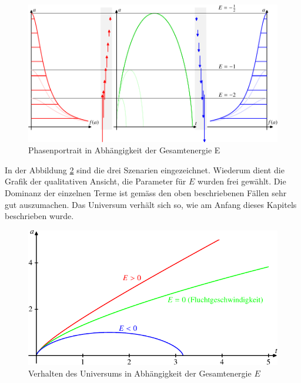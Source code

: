 \begin{refsection}
\begin{figure}
	\centering
	\includegraphics[width  = \textwidth]{friedmann/images/friedmann-6.pdf}
	\caption{Phasenportrait in Abhängigkeit der Gesamtenergie E
		\label{friedmann:phasenportrait}}
\end{figure}%
In der Abbildung \ref{friedmann:universumMasse} sind die drei Szenarien eingezeichnet. Wiederum dient die Grafik der qualitativen Ansicht, die Parameter für $E$ wurden frei gewählt. Die Dominanz der einzelnen Terme ist gemäss den oben beschriebenen Fällen sehr gut auszumachen. Das Universum verhält sich so, wie am Anfang dieses Kapitels beschrieben wurde.

\begin{figure}[h]
	\centering
	\includegraphics{friedmann/images/friedmann-4.pdf}
	\caption{Verhalten des Universums in Abhängigkeit der Gesamtenergie $E$
		\label{friedmann:universumMasse}}
\end{figure}%


\end{refsection}
